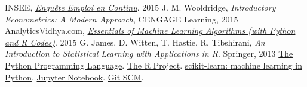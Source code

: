\documentclass[a4paper]{article}
\begin{document}
\clearpage
\begin{thebibliography}{9}
        INSEE,
        \href{https://www.insee.fr/fr/statistiques/2388681}{\emph{Enqu\^ete Emploi en Continu}}.
        2015
        J. M. Wooldridge,
        \emph{Introductory Econometrics: A Modern Approach},
        CENGAGE Learning,
        2015
        AnalyticsVidhya.com,
        \href{https://www.analyticsvidhya.com/blog/2015/08/common-machine-learning-algorithms/}
{\emph{Essentials of Machine Learning Algorithms (with Python and R Codes)}}.
        2015
        G. James, D. Witten, T. Hastie, R. Tibshirani,
        \emph{An Introduction to Statistical Learning with Applications in R}.
        Springer,
        2013
        \href{https://www.python.org/}{The Python Programming Language}.
        \href{https://www.r-project.org/}{The R Project}.
        \href{http://scikit-learn.org/}{scikit-learn: machine learning in Python}.
        \href{https://jupyter.org/}{Jupyter Notebook}.
        \href{https://git-scm.com/}{Git SCM}.
\end{thebibliography}
\end{document}
